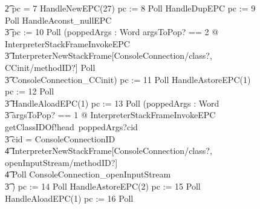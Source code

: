 \begin{figure}[tp!]
{\begin{circus}
    \t2 {} \circelse pc = 7 \circthen HandleNewEPC(27) \circseq pc := 8 \circseq Poll \circseq HandleDupEPC \circseq pc := 9 \circseq  Poll \circseq HandleAconst\_nullEPC \circseq \\
    \t3 pc := 10 \circseq Poll \circseq (\circvar poppedArgs : Word \circspot  \lschexpract \exists argsToPop? == 2 @ InterpreterStackFrameInvokeEPC \rschexpract \circseq \\
    \t3 \lschexpract InterpreterNewStackFrame[ConsoleConnection/class?, CCinit/methodID?] \rschexpract \circseq Poll \circseq \\
    \t3 ConsoleConnection\_CCinit) \circseq pc := 11 \circseq Poll \circseq HandleAstoreEPC(1) \circseq pc := 12 \circseq Poll \circseq \\
    \t3 HandleAloadEPC(1) \circseq pc := 13 \circseq Poll \circseq (\circvar poppedArgs : Word \circspot \\
    \t3 \lschexpract \exists argsToPop? == 1 @ InterpreterStackFrameInvokeEPC \rschexpract \circseq getClassIDOf!head~poppedArgs?cid \then {} \\
    \t3 \circif cid = ConsoleConnectionID \circthen {} \\
    \t4 \lschexpract InterpreterNewStackFrame[ConsoleConnection/class?, openInputStream/methodID?] \rschexpract \circseq \\
    \t4 Poll \circseq ConsoleConnection\_openInputStream \\
    \t3 \circfi) \circseq pc := 14 \circseq Poll \circseq HandleAstoreEPC(2) \circseq pc := 15 \circseq Poll \circseq HandleAloadEPC(1) \circseq pc := 16 \circseq Poll \circseq \\

\end{circus}}
\end{figure}
